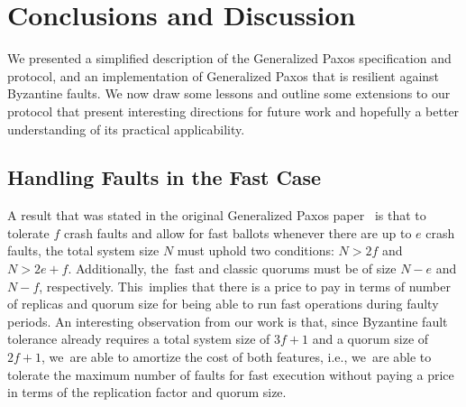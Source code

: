 \documentclass[algorithms,article,accept,moreauthors,pdftex,10pt,a4paper]{Definitions/mdpi}
\begin{document}
%
\section{Conclusions and Discussion}
\label{sec:disc}
%
We presented a simplified description of the Generalized Paxos specification and protocol, 
and an implementation of Generalized Paxos that is resilient against Byzantine faults.
We now draw some lessons and outline some extensions to our protocol that present interesting directions for future work and hopefully
a better understanding of its practical applicability.

\subsection{{Handling Faults in the Fast Case}} %
A result that was stated in the original Generalized Paxos
paper~\cite{Lamport2005} is that to tolerate $f$ crash faults and
allow for fast ballots whenever there are up to $e$ crash faults, the
total system size $N$ must uphold two conditions:
$N > 2f$ and $N > 2e+f$.
Additionally, the~fast and classic quorums must be of size $N-e$ and $N-f$, respectively. This~implies that there is a price to pay in terms of number of replicas and quorum size for being able to run fast operations during faulty periods.
An interesting observation from our work is that, since Byzantine fault tolerance already requires a total system size of $3f+1$ and a quorum size of $2f+1$, we~are able to amortize the cost of both features, i.e., we~are able to tolerate the maximum number of faults for fast execution without paying a price in terms of the replication factor and quorum size.
\end{document}
